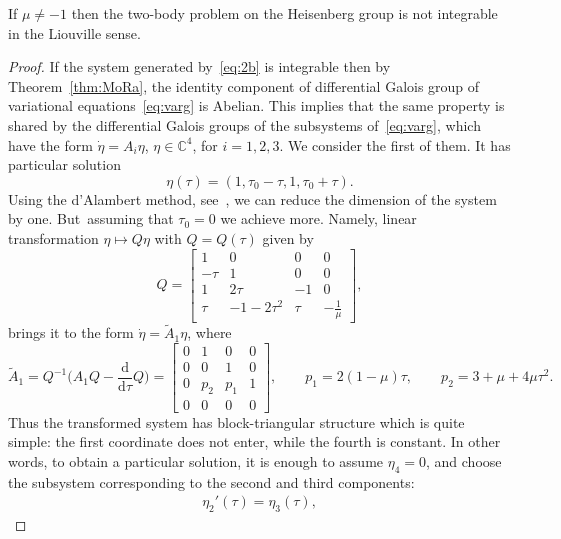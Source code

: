 \begin{Theorem} %
 If $\mu\neq -1$ then the two-body problem on the Heisenberg group is
 not integrable in the Liouville sense.
\end{Theorem}
\begin{proof}
 If the system generated by~\eqref{eq:2b} is integrable then by
 Theorem~\ref{thm:MoRa}, the identity component of differential
 Galois group of variational equations~\eqref{eq:varg} is Abelian.
 This implies that the same property is shared by the differential Galois groups
 of the subsystems of~\eqref{eq:varg}, which have the form
 $\dot\eta=A_i \eta$, $\eta\in\mathbb{C}^4$, for $i=1,2,3$. We
 consider the first of them. It has particular solution
 \begin{equation}
 \label{par}
 \eta(\tau)=(1, \tau_0-\tau,1, \tau_0+\tau).
 \end{equation}
 Using the d'Alambert method, see~\cite{Walter}, we can reduce the
 dimension of the system by one. But~assuming that $\tau_0=0$ we
 achieve more. Namely, linear transformation $\eta\mapsto Q\eta$ with
 $Q=Q(\tau)$ given by
 \begin{equation*}
 Q = \begin{bmatrix}
 1 & 0 & 0 & 0\\
 -\tau & 1 & 0 & 0\\
 1 & 2\tau & -1 & 0\\
 \tau & -1-2\tau^2 & \tau & -\frac{1}{\mu}
 \end{bmatrix}\!,
 \end{equation*}
 brings it to the form $\dot{\eta}=\widetilde{A}_1\eta$, where
 \begin{equation*}
 \widetilde{A}_1 =Q^{-1}\bigg(A_1 Q -\frac{\mathrm{d}}{\mathrm{d}\tau}Q\bigg) = \begin{bmatrix}
 0 & 1 & 0 & 0\\
 0 & 0 & 1 & 0\\
 0 & p_2 & p_1 & 1\\
 0 & 0 & 0 & 0
 \end{bmatrix}\!,\qquad p_1 = 2(1-\mu)\tau,\qquad p_2 =
 3+\mu+4\mu\tau^2.
 \end{equation*}
 Thus the transformed system has block-triangular structure which is
 quite simple: the first coordinate does not enter, while the fourth
 is constant. In other words, to obtain a particular solution, it is
 enough to assume $\eta_4=0$, and choose the subsystem corresponding to the second and third
 components:
 \begin{gather*}
 \eta_2'(\tau) = \eta_3(\tau),

\end{gather*}
\end{proof}

